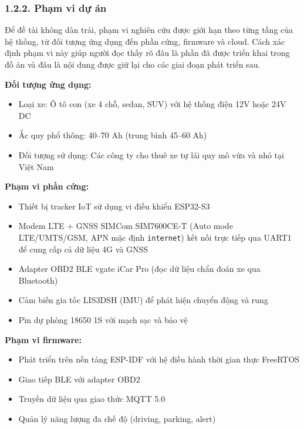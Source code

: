 \documentclass[a4paper]{extarticle}
\providecommand{\tightlist}{%
  \setlength{\itemsep}{0pt}\setlength{\parskip}{0pt}}
\begin{document}
\subsubsection{1.2.2. Phạm vi dự
án}\label{122-phux1ea1m-vi-dux1ef1-uxe1n}

Để đề tài không dàn trải, phạm vi nghiên cứu được giới hạn theo từng
tầng của hệ thống, từ đối tượng ứng dụng đến phần cứng, firmware và
cloud. Cách xác định phạm vi này giúp người đọc thấy rõ đâu là phần đã
được triển khai trong đồ án và đâu là nội dung được giữ lại cho các giai
đoạn phát triển sau.

\textbf{Đối tượng ứng dụng:}

\begin{itemize}
\tightlist
\item
  Loại xe: Ô tô con (xe 4 chỗ, sedan, SUV) với hệ thống điện 12V hoặc
  24V DC
\item
  Ắc quy phổ thông: 40--70 Ah (trung bình 45--60 Ah)
\item
  Đối tượng sử dụng: Các công ty cho thuê xe tự lái quy mô vừa và nhỏ
  tại Việt Nam
\end{itemize}

\textbf{Phạm vi phần cứng:}

\begin{itemize}
\tightlist
\item
  Thiết bị tracker IoT sử dụng vi điều khiển ESP32-S3
\item
  Modem LTE + GNSS SIMCom SIM7600CE-T (Auto mode LTE/UMTS/GSM, APN mặc
  định \texttt{internet}) kết nối trực tiếp qua UART1 để cung cấp cả dữ
  liệu 4G và GNSS
\item
  Adapter OBD2 BLE vgate iCar Pro (đọc dữ liệu chẩn đoán xe qua
  Bluetooth)
\item
  Cảm biến gia tốc LIS3DSH (IMU) để phát hiện chuyển động và rung
\item
  Pin dự phòng 18650 1S với mạch sạc và bảo vệ
\end{itemize}

\textbf{Phạm vi firmware:}

\begin{itemize}
\tightlist
\item
  Phát triển trên nền tảng ESP-IDF với hệ điều hành thời gian thực
  FreeRTOS
\item
  Giao tiếp BLE với adapter OBD2
\item
  Truyền dữ liệu qua giao thức MQTT 5.0
\item
  Quản lý năng lượng đa chế độ (driving, parking, alert)
\end{itemize}
\end{document}
